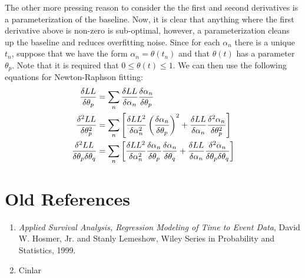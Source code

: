 \documentclass[10pt]{article}
\begin{document}
The other more pressing reason to consider the the first and second derivatives is a parameterization of the baseline.  Now, it is clear that anything where the 
first derivative above is non-zero is sub-optimal, however, a parameterization cleans up the baseline and reduces overfitting noise.
Since for each $\alpha_n$ there is a unique $t_n$, suppose that we have the form $\alpha_n=\theta(t_n)$ and that $\theta(t)$ has a parameter $\theta_p$. 
Note that it is required that $0 \le \theta(t) \le 1$. We can then
use the following equations for Newton-Raphson fitting:
\begin{align*}
{\delta LL \over \delta \theta_p}&=\sum_n {\delta LL \over \delta \alpha_n}{\delta \alpha_n\over \delta \theta_p}\\
{\delta^2 LL \over \delta \theta_p^2}&=\sum_n \left[{{\delta LL^2 \over \delta \alpha_n^2}\left({\delta \alpha_n\over \delta \theta_p}\right)^2
+{\delta LL \over \delta \alpha_n}{\delta^2 \alpha_n\over \delta \theta_p^2}
}\right]\\
{\delta^2 LL \over \delta \theta_p \delta \theta_q}&=\sum_n \left[{{\delta LL^2 \over \delta \alpha_n^2}{\delta \alpha_n\over \delta \theta_p}
{\delta \alpha_n\over \delta \theta_q}
+{\delta LL \over \delta \alpha_n}{\delta^2 \alpha_n\over \delta \theta_p \delta \theta_q}
}\right]
\end{align*}





\section{Old References}
\begin{enumerate}
\item {\em Applied Survival Analysis, Regression Modeling of Time to Event Data}, David W. Hosmer, Jr. and Stanly Lemeshow, Wiley Series in Probability and Statistics, 1999.
\item Cinlar
\end{enumerate}
\end{document}
